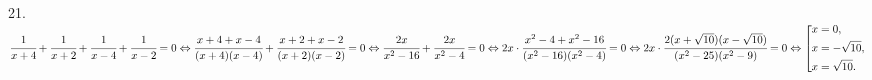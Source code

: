 21. $\cfrac{1}{x+4}+\cfrac{1}{x+2}+\cfrac{1}{x-4}+\cfrac{1}{x-2}=0\Leftrightarrow \cfrac{x+4+x-4}{(x+4)(x-4)}+\cfrac{x+2+x-2}{(x+2)(x-2)}=0\Leftrightarrow
\cfrac{2x}{x^2-16}+\cfrac{2x}{x^2-4}=0\Leftrightarrow 2x\cdot \cfrac{x^2-4+x^2-16}{(x^2-16)(x^2-4)}=0\Leftrightarrow 2x\cdot \cfrac{2(x+\sqrt{10})(x-\sqrt{10})}{(x^2-25)(x^2-9)}=0 \Leftrightarrow
    \left[
      \begin{gathered}
        x=0, \hfill
        \\
        x=-\sqrt{10}, \hfill
        \\
        x=\sqrt{10}. \hfill
      \end{gathered}
    \right. \hfill$\\
